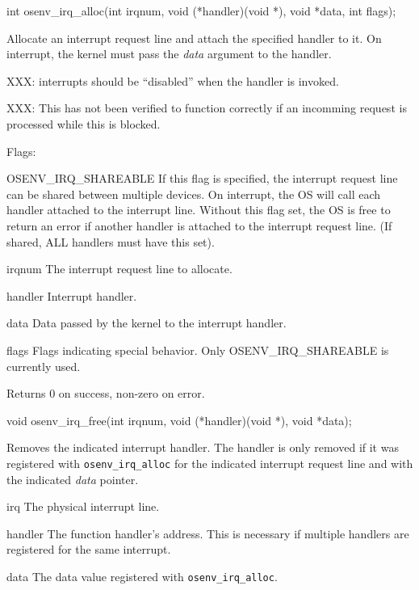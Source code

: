 \begin{apisyn}
	\funcproto int osenv_irq_alloc(int irqnum, void (*handler)(void *),
					void *data, int flags);
\end{apisyn}
\drvtoosb
\begin{apidesc}
	Allocate an interrupt request line and attach the specified
	handler to it.  On interrupt, the kernel must pass the \emph{data}
	argument to the handler.

	XXX: interrupts should be ``disabled'' when the handler is invoked.

	XXX: This has not been verified to function correctly if an
	incomming request is processed while this is blocked.

	Flags:
	\begin{icsymlist}
	\item[OSENV_IRQ_SHAREABLE]
		If this flag is specified, the interrupt
		request line can be shared between multiple
		devices.  On interrupt, the OS will call
		each handler attached to the interrupt line.
		Without this flag set, the OS is free to return
		an error if another handler is attached to the
		interrupt request line.
		(If shared, ALL handlers must have this set).
	\end{icsymlist}
\end{apidesc}
\begin{apiparm}
	\item[irqnum]
		The interrupt request line to allocate.
	\item[handler]
		Interrupt handler.
	\item[data]
		Data passed by the kernel to the interrupt handler.
	\item[flags]
		Flags indicating special behavior.
		Only OSENV_IRQ_SHAREABLE is currently used.
\end{apiparm}
\begin{apiret}
	Returns 0 on success, non-zero on error.
\end{apiret}


\begin{apisyn}
	\funcproto void osenv_irq_free(int irqnum, void (*handler)(void *),
					void *data);
\end{apisyn}
\drvtoosn
\begin{apidesc}
	Removes the indicated interrupt handler.
	The handler is only removed if it was registered with
	{\tt osenv_irq_alloc} for the indicated interrupt request line
	and with the indicated \emph{data} pointer.
\end{apidesc}
\begin{apiparm}
	\item[irq]
		The physical interrupt line.
	\item[handler]
		The function handler's address.
		This is necessary if multiple handlers are registered
		for the same interrupt.
	\item[data]
		The data value registered with {\tt osenv_irq_alloc}.
\end{apiparm}
\com{%
\begin{apiret}
\end{apiret}
}


